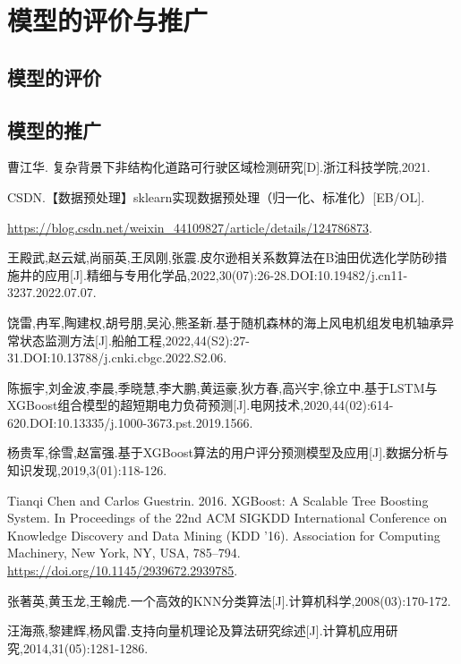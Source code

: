 \documentclass{MathorCupmodeling}
\begin{document}
	\section{模型的评价与推广}
	\subsection{模型的评价}
	\subsection{模型的推广}
	\newpage
	
	\begin{spacing}{1.08}
	\begin{thebibliography}{99}
	曹江华. 复杂背景下非结构化道路可行驶区域检测研究[D].浙江科技学院,2021.

	CSDN.【数据预处理】sklearn实现数据预处理（归一化、标准化）[EB/OL].
	
	\url{https://blog.csdn.net/weixin_44109827/article/details/124786873}.


	王殿武,赵云斌,尚丽英,王凤刚,张震.皮尔逊相关系数算法在B油田优选化学防砂措施井的应用[J].精细与专用化学品,2022,30(07):26-28.DOI:10.19482/j.cn11-3237.2022.07.07.

	饶雷,冉军,陶建权,胡号朋,吴沁,熊圣新.基于随机森林的海上风电机组发电机轴承异常状态监测方法[J].船舶工程,2022,44(S2):27-31.DOI:10.13788/j.cnki.cbgc.2022.S2.06.

	陈振宇,刘金波,李晨,季晓慧,李大鹏,黄运豪,狄方春,高兴宇,徐立中.基于LSTM与XGBoost组合模型的超短期电力负荷预测[J].电网技术,2020,44(02):614-620.DOI:10.13335/j.1000-3673.pst.2019.1566.

	杨贵军,徐雪,赵富强.基于XGBoost算法的用户评分预测模型及应用[J].数据分析与知识发现,2019,3(01):118-126.

	Tianqi Chen and Carlos Guestrin. 2016. XGBoost: A Scalable Tree Boosting System. In Proceedings of the 22nd ACM SIGKDD International Conference on Knowledge Discovery and Data Mining (KDD '16). Association for Computing Machinery, New York, NY, USA, 785–794. \url{https://doi.org/10.1145/2939672.2939785}.

	张著英,黄玉龙,王翰虎.一个高效的KNN分类算法[J].计算机科学,2008(03):170-172.

	汪海燕,黎建辉,杨风雷.支持向量机理论及算法研究综述[J].计算机应用研究,2014,31(05):1281-1286.


\end{thebibliography}
\end{spacing}
\end{document}
